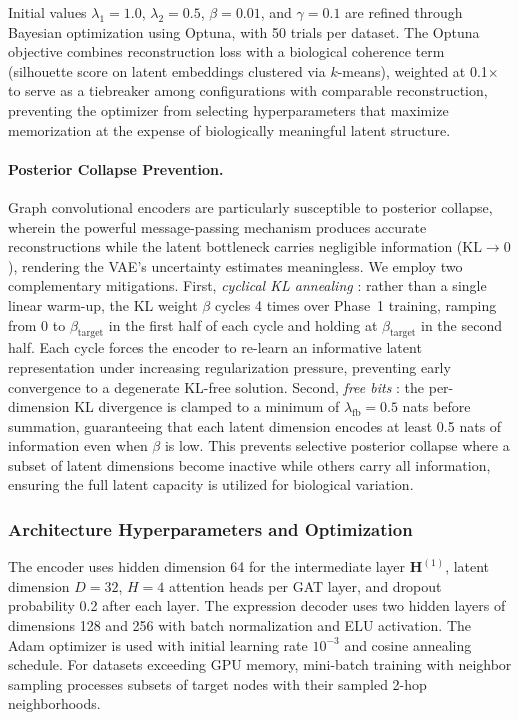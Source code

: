 \documentclass{article}
\newcommand{\KL}{\mathrm{KL}}
\begin{document}
Initial values $\lambda_1 = 1.0$, $\lambda_2 = 0.5$, $\beta = 0.01$, and $\gamma = 0.1$ are refined through Bayesian optimization using Optuna, with 50 trials per dataset. The Optuna objective combines reconstruction loss with a biological coherence term (silhouette score on latent embeddings clustered via $k$-means), weighted at 0.1$\times$ to serve as a tiebreaker among configurations with comparable reconstruction, preventing the optimizer from selecting hyperparameters that maximize memorization at the expense of biologically meaningful latent structure.

\paragraph{Posterior Collapse Prevention.} Graph convolutional encoders are particularly susceptible to posterior collapse, wherein the powerful message-passing mechanism produces accurate reconstructions while the latent bottleneck carries negligible information ($\KL \to 0$), rendering the VAE's uncertainty estimates meaningless. We employ two complementary mitigations. First, \textit{cyclical KL annealing} \cite{fu2019cyclical}: rather than a single linear warm-up, the KL weight $\beta$ cycles 4 times over Phase~1 training, ramping from 0 to $\beta_{\text{target}}$ in the first half of each cycle and holding at $\beta_{\text{target}}$ in the second half. Each cycle forces the encoder to re-learn an informative latent representation under increasing regularization pressure, preventing early convergence to a degenerate KL-free solution. Second, \textit{free bits} \cite{kingma2016improved}: the per-dimension KL divergence is clamped to a minimum of $\lambda_{\text{fb}} = 0.5$ nats before summation, guaranteeing that each latent dimension encodes at least 0.5 nats of information even when $\beta$ is low. This prevents selective posterior collapse where a subset of latent dimensions become inactive while others carry all information, ensuring the full latent capacity is utilized for biological variation.


\subsubsection{Architecture Hyperparameters and Optimization}

The encoder uses hidden dimension 64 for the intermediate layer $\mathbf{H}^{(1)}$, latent dimension $D = 32$, $H = 4$ attention heads per GAT layer, and dropout probability 0.2 after each layer. The expression decoder uses two hidden layers of dimensions 128 and 256 with batch normalization and ELU activation. The Adam optimizer \cite{kingma2014adam} is used with initial learning rate $10^{-3}$ and cosine annealing schedule. For datasets exceeding GPU memory, mini-batch training with neighbor sampling \cite{hamilton2017inductive} processes subsets of target nodes with their sampled 2-hop neighborhoods.
\end{document}
